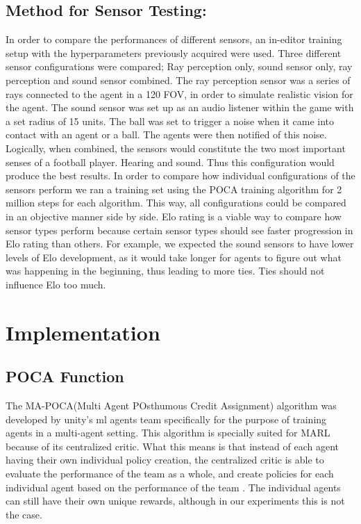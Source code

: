 \documentclass{LSkill}
\begin{document}
\subsection{Method for Sensor Testing:}
In order to compare the performances of different sensors, an in-editor training setup with the hyperparameters previously acquired were used. Three different sensor configurations were compared; Ray perception only, sound sensor only, ray perception and sound sensor combined. The ray perception sensor was a series of rays connected to the agent in a 120 FOV, in order to simulate realistic vision for the agent. The sound sensor was set up as an audio listener within the game with a set radius of 15 units. The ball was set to trigger a noise when it came into contact with an agent or a ball. The agents were then notified of this noise. Logically, when combined, the sensors would constitute the two most important senses of a football player. Hearing and sound. Thus this configuration would produce the best results. In order to compare how individual configurations of the sensors perform we ran a training set using the POCA training algorithm for 2 million steps for each algorithm. This way, all configurations could be compared in an objective manner side by side. 
	Elo rating is a viable way to compare how sensor types perform because certain sensor types should see faster progression in Elo rating than others. For example, we expected the sound sensors to have lower levels of Elo development, as it would take longer for agents to figure out what was happening in the beginning, thus leading to more ties. Ties should not influence Elo too much. 

\section{Implementation}
\subsection{POCA Function}
The MA-POCA(Multi Agent POsthumous Credit Assignment) algorithm was developed by unity’s ml agents team specifically for the purpose of training agents in a multi-agent setting. This algorithm is specially suited for MARL because of its centralized critic. What this means is that instead of each agent having their own individual policy creation, the centralized critic is able to evaluate the performance of the team as a whole, and create policies for each individual agent based on the performance of the team \cite{cohen2022absorbing_states}. The individual agents can still have their own unique rewards, although in our experiments this is not the case.
\end{document}
